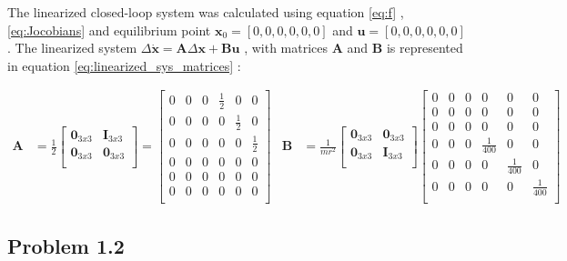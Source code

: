 The linearized  closed-loop system was calculated using equation \eqref{eq:f} , \eqref{eq:Jocobians} and equilibrium point $\mathbf{x}_0 = [0,0,0,0,0,0]$ and $\mathbf{u} = [0,0,0,0,0,0]$. The linearized system $\Delta \dot{\mathbf{x}} = \mathbf{A}\Delta \mathbf{x} + \mathbf{Bu}$ , with matrices $\mathbf{A}$ and $\mathbf{B}$ is represented in equation \eqref{eq:linearized_sys_matrices} :


\begin{equation}
    \begin{aligned}
	\mathbf{A}
	&=
	\frac{1}{2}
	\begin{bmatrix}
		\mathbf{0}_{3x3} & \mathbf{I}_{3x3}\\
		\mathbf{0}_{3x3} & \mathbf{0}_{3x3}\\
	\end{bmatrix}
	=
	\begin{bmatrix}
		0 & 0 & 0 & \frac{1}{2} & 0   & 0\\
		0 & 0 & 0 & 0   & \frac{1}{2} & 0\\
		0 & 0 & 0 & 0   & 0   & \frac{1}{2}\\
		0 & 0 & 0 & 0 & 0 & 0\\
		0 & 0 & 0 & 0 & 0 & 0\\
		0 & 0 & 0 & 0 & 0 & 0\\
	\end{bmatrix}
	&
	\mathbf{B}& = 
	\frac{1}{mr^2}
	\begin{bmatrix}
		\mathbf{0}_{3x3} & \mathbf{0}_{3x3}\\
		\mathbf{0}_{3x3} & \mathbf{I}_{3x3}\\
	\end{bmatrix}
	\begin{bmatrix}
		0 & 0 & 0 & 0 & 0 & 0\\
		0 & 0 & 0 & 0 & 0 & 0\\
		0 & 0 & 0 & 0 & 0 & 0\\
		0 & 0 & 0 & \frac{1}{400} & 0 & 0\\
		0 & 0 & 0 & 0 & \frac{1}{400} & 0\\
		0 & 0 & 0 & 0 & 0 & \frac{1}{400}\\
	\end{bmatrix}
	\end{aligned}
	\label{eq:linearized_sys_matrices}
\end{equation}


\subsection*{Problem 1.2}


